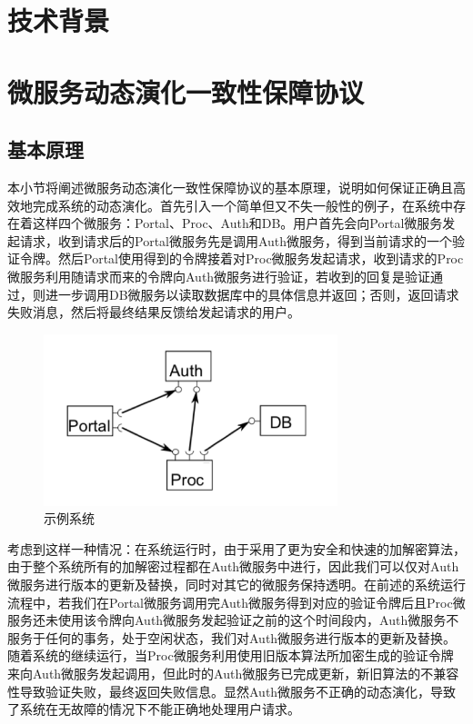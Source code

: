 \documentclass[12pt,a4paper]{article}
\theoremstyle{definition}
\begin{document}




\newpage
\section{技术背景}\label{Background}

\newpage
\section{微服务动态演化一致性保障协议}\label{MsDymEvo}

\subsection{基本原理}
本小节将阐述微服务动态演化一致性保障协议的基本原理，说明如何保证正确且高效地完成系统的动态演化。首先引入一个简单但又不失一般性的例子，在系统中存在着这样四个微服务：Portal、Proc、Auth和DB。用户首先会向Portal微服务发起请求，收到请求后的Portal微服务先是调用Auth微服务，得到当前请求的一个验证令牌。然后Portal使用得到的令牌接着对Proc微服务发起请求，收到请求的Proc微服务利用随请求而来的令牌向Auth微服务进行验证，若收到的回复是验证通过，则进一步调用DB微服务以读取数据库中的具体信息并返回；否则，返回请求失败消息，然后将最终结果反馈给发起请求的用户。
\begin{figure}[ht]
 \centering
 \includegraphics[height=5cm]{images/Example.png}
 \caption{示例系统}
 \label{fig:Example}
\end{figure}


考虑到这样一种情况：在系统运行时，由于采用了更为安全和快速的加解密算法，由于整个系统所有的加解密过程都在Auth微服务中进行，因此我们可以仅对Auth微服务进行版本的更新及替换，同时对其它的微服务保持透明。在前述的系统运行流程中，若我们在Portal微服务调用完Auth微服务得到对应的验证令牌后且Proc微服务还未使用该令牌向Auth微服务发起验证之前的这个时间段内，Auth微服务不服务于任何的事务，处于空闲状态，我们对Auth微服务进行版本的更新及替换。随着系统的继续运行，当Proc微服务利用使用旧版本算法所加密生成的验证令牌来向Auth微服务发起调用，但此时的Auth微服务已完成更新，新旧算法的不兼容性导致验证失败，最终返回失败信息。显然Auth微服务不正确的动态演化，导致了系统在无故障的情况下不能正确地处理用户请求。
\end{document}
